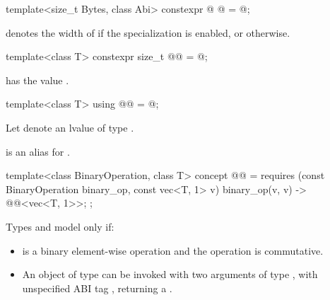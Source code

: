\begin{itemdecl}
template<size_t Bytes, class Abi>
  constexpr @ @ = @\seebelow@;
\end{itemdecl}

\begin{itemdescr}
\pnum
{} denotes
the width of 
if the specialization  is enabled, or
 otherwise.
\end{itemdescr}

\begin{itemdecl}
template<class T> constexpr size_t @@ = @\seebelow@;
\end{itemdecl}

\begin{itemdescr}
\pnum
{} has the value
.
\end{itemdescr}

\begin{itemdecl}
template<class T> using @@ = @\seebelow@;
\end{itemdecl}

\begin{itemdescr}
\pnum
Let  denote an lvalue of type .

\pnum
{} is an alias for .
\end{itemdescr}

\begin{itemdecl}
template<class BinaryOperation, class T>
  concept @@ =
    requires (const BinaryOperation binary_op, const vec<T, 1> v) {
      { binary_op(v, v) } -> @@<vec<T, 1>>;
    };
\end{itemdecl}

\begin{itemdescr}
\pnum
Types  and  model
 only if:
\begin{itemize}
\item {} is a binary element-wise operation and the
operation is commutative.

\item An object of type  can be invoked with two
arguments of type , with unspecified ABI tag
, returning a .
\end{itemize}
\end{itemdescr}

